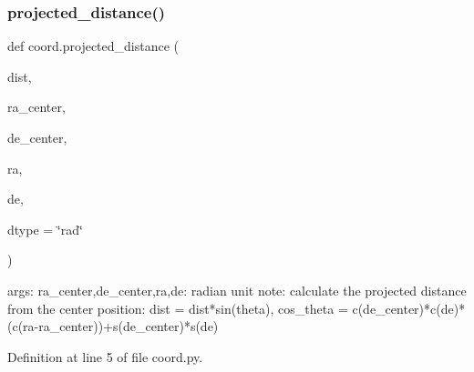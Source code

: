 \subsubsection{\texorpdfstring{projected\+\_\+distance()}{projected\_distance()}}
{\footnotesize\ttfamily def coord.\+projected\+\_\+distance (\begin{DoxyParamCaption}\item[{}]{dist,  }\item[{}]{ra\+\_\+center,  }\item[{}]{de\+\_\+center,  }\item[{}]{ra,  }\item[{}]{de,  }\item[{}]{dtype = {\ttfamily \char`\"{}rad\char`\"{}} }\end{DoxyParamCaption})}

\begin{DoxyVerb}args:
    ra_center,de_center,ra,de: radian unit
note:
    calculate the projected distance from the center position:
    dist = dist*sin(theta),
    cos_theta = c(de_center)*c(de)*(c(ra-ra_center))+s(de_center)*s(de)
\end{DoxyVerb}
 

Definition at line 5 of file coord.\+py.


